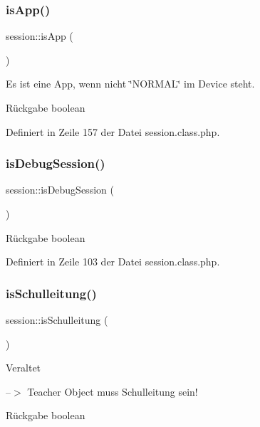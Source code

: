\subsubsection{\texorpdfstring{is\+App()}{isApp()}}
{\footnotesize\ttfamily session\+::is\+App (\begin{DoxyParamCaption}{ }\end{DoxyParamCaption})}

Es ist eine App, wenn nicht \char`\"{}\+N\+O\+R\+M\+A\+L\char`\"{} im Device steht. \begin{DoxyReturn}{Rückgabe}
boolean 
\end{DoxyReturn}


Definiert in Zeile 157 der Datei session.\+class.\+php.

\mbox{\label{classsession_a1cd5fba2d2ab09f11b686b6bfb77d38f}} 
\subsubsection{\texorpdfstring{is\+Debug\+Session()}{isDebugSession()}}
{\footnotesize\ttfamily session\+::is\+Debug\+Session (\begin{DoxyParamCaption}{ }\end{DoxyParamCaption})}

\begin{DoxyReturn}{Rückgabe}
boolean 
\end{DoxyReturn}


Definiert in Zeile 103 der Datei session.\+class.\+php.

\mbox{\label{classsession_a1e5cf401d45d01cc32e1eeb2aae6ef8e}} 
\subsubsection{\texorpdfstring{is\+Schulleitung()}{isSchulleitung()}}
{\footnotesize\ttfamily session\+::is\+Schulleitung (\begin{DoxyParamCaption}{ }\end{DoxyParamCaption})}

\begin{DoxyRefDesc}{Veraltet}
\item[\mbox{\hyperlink{deprecated__deprecated000016}{Veraltet}}]--$>$ Teacher Object muss Schulleitung sein! \end{DoxyRefDesc}
\begin{DoxyReturn}{Rückgabe}
boolean 
\end{DoxyReturn}



